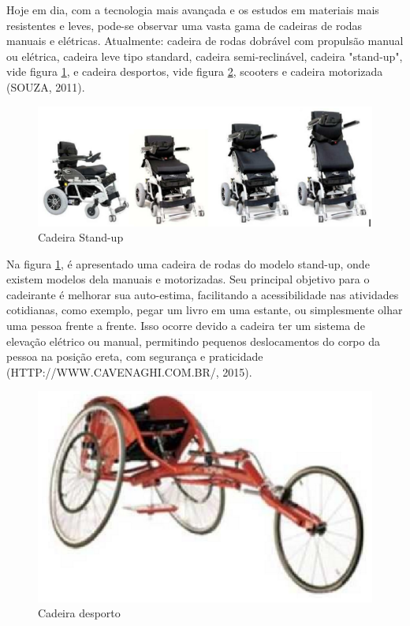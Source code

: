 Hoje em dia, com a tecnologia mais avançada e os estudos em materiais mais resistentes e leves, pode-se observar uma vasta gama de cadeiras de rodas manuais e elétricas. Atualmente: cadeira de rodas dobrável com propulsão manual ou elétrica, cadeira leve tipo standard, cadeira semi-reclinável, cadeira "stand-up", vide figura \ref{fig:stand_up}, e cadeira desportos, vide figura \ref{fig:desporto}, scooters e cadeira motorizada (SOUZA, 2011).

\begin{figure}[!htb]
  \centering
  \includegraphics[keepaspectratio=true,scale=0.50]{figuras/introducao/versoes}
  \caption{Cadeira Stand-up}
  \label{fig:stand_up}
\end{figure}


Na figura \ref{fig:stand_up}, é apresentado uma cadeira de rodas do modelo stand-up, onde existem modelos dela manuais e motorizadas. Seu principal objetivo para o cadeirante é melhorar sua auto-estima, facilitando a acessibilidade nas atividades cotidianas, como exemplo, pegar um livro em uma estante, ou simplesmente olhar uma pessoa frente a frente. Isso ocorre devido a cadeira ter um sistema de elevação elétrico ou manual, permitindo pequenos deslocamentos do corpo da pessoa na posição ereta, com segurança e praticidade (HTTP://WWW.CAVENAGHI.COM.BR/, 2015).

\begin{figure}[!htb]
  \centering
  \includegraphics[keepaspectratio=true,scale=0.50]{figuras/introducao/cadeira_desporte}
  \caption{Cadeira desporto}
  \label{fig:desporto}
\end{figure}


